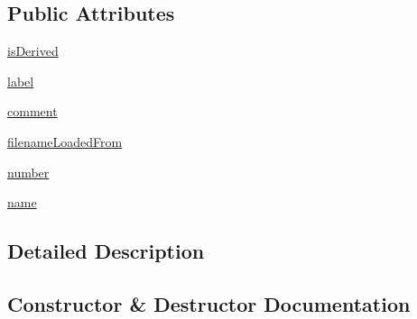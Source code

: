 \subsection*{Public Attributes}
\begin{DoxyCompactItemize}
\item 
\mbox{\hyperlink{classgetdist_1_1paramnames_1_1ParamInfo_a0576d06e71a753d9ce17db95e0a66f18}{is\+Derived}}
\item 
\mbox{\hyperlink{classgetdist_1_1paramnames_1_1ParamInfo_a9db4ac644cf038d4c325de7a26fd4f20}{label}}
\item 
\mbox{\hyperlink{classgetdist_1_1paramnames_1_1ParamInfo_abdee12df655600eba9bb61a100b2920b}{comment}}
\item 
\mbox{\hyperlink{classgetdist_1_1paramnames_1_1ParamInfo_a2e1ceb931533e380b93e09fe6215071a}{filename\+Loaded\+From}}
\item 
\mbox{\hyperlink{classgetdist_1_1paramnames_1_1ParamInfo_ab94916bce53105db07e78ab672a7a314}{number}}
\item 
\mbox{\hyperlink{classgetdist_1_1paramnames_1_1ParamInfo_afbbc9d0845233cbdb99137ff23b92cbd}{name}}
\end{DoxyCompactItemize}


\subsection{Detailed Description}
 

\subsection{Constructor \& Destructor Documentation}
\mbox{\label{classgetdist_1_1paramnames_1_1ParamInfo_ac84b3807f29c2c25430ff7cd31ac298c}} 
